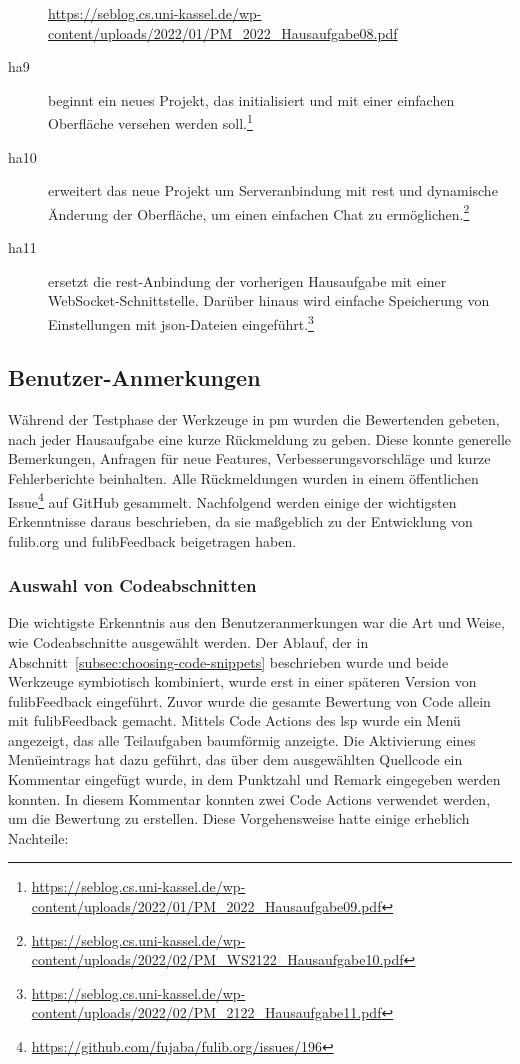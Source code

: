 \begin{description}
{        \url{https://seblog.cs.uni-kassel.de/wp-content/uploads/2022/01/PM_2022_Hausaufgabe08.pdf}
    }
    \item[\ac{ha}9] beginnt ein neues Projekt, das initialisiert und mit einer einfachen Oberfläche versehen werden soll.\footnote{
        \url{https://seblog.cs.uni-kassel.de/wp-content/uploads/2022/01/PM_2022_Hausaufgabe09.pdf}
    }
    \item[\ac{ha}10] erweitert das neue Projekt um Serveranbindung mit \ac{rest} und dynamische Änderung der Oberfläche, um einen einfachen Chat zu ermöglichen.\footnote{
        \url{https://seblog.cs.uni-kassel.de/wp-content/uploads/2022/02/PM_WS2122_Hausaufgabe10.pdf}
    }
    \item[\ac{ha}11] ersetzt die \ac{rest}-Anbindung der vorherigen Hausaufgabe mit einer WebSocket-Schnittstelle.
    Darüber hinaus wird einfache Speicherung von Einstellungen mit \ac{json}-Dateien eingeführt.\footnote{
        \url{https://seblog.cs.uni-kassel.de/wp-content/uploads/2022/02/PM_2122_Hausaufgabe11.pdf}
    }
\end{description}

\subsection{Benutzer-Anmerkungen}\label{subsec:user-feedback}

Während der Testphase der Werkzeuge in \ac{pm} wurden die Bewertenden gebeten, nach jeder Hausaufgabe eine kurze Rückmeldung zu geben.
Diese konnte generelle Bemerkungen, Anfragen für neue Features, Verbesserungsvorschläge und kurze Fehlerberichte beinhalten.
Alle Rückmeldungen wurden in einem öffentlichen Issue\footnote{
    \url{https://github.com/fujaba/fulib.org/issues/196}
} auf GitHub gesammelt.
Nachfolgend werden einige der wichtigsten Erkenntnisse daraus beschrieben, da sie maßgeblich zu der Entwicklung von fulib.org und fulibFeedback beigetragen haben.

\subsubsection{Auswahl von Codeabschnitten}

Die wichtigste Erkenntnis aus den Benutzeranmerkungen war die Art und Weise, wie Codeabschnitte ausgewählt werden.
Der Ablauf, der in Abschnitt~\ref{subsec:choosing-code-snippets} beschrieben wurde und beide Werkzeuge symbiotisch kombiniert, wurde erst in einer späteren Version von fulibFeedback eingeführt.
Zuvor wurde die gesamte Bewertung von Code allein mit fulibFeedback gemacht.
Mittels Code Actions des \ac{lsp} wurde ein Menü angezeigt, das alle Teilaufgaben baumförmig anzeigte.
Die Aktivierung eines Menüeintrags hat dazu geführt, das über dem ausgewählten Quellcode ein Kommentar eingefügt wurde, in dem Punktzahl und Remark eingegeben werden konnten.
In diesem Kommentar konnten zwei Code Actions verwendet werden, um die Bewertung zu erstellen.
Diese Vorgehensweise hatte einige erheblich Nachteile:


